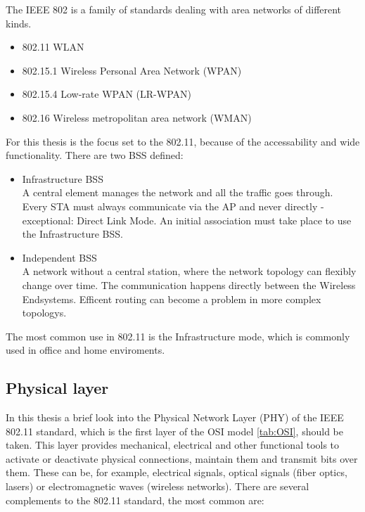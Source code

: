 The \ac{IEEE} 802 is a family of standards dealing with area networks of different kinds.
\begin{itemize}
	\item 802.11 \ac{WLAN}
	\item 802.15.1 Wireless Personal Area Network (WPAN)
	\item 802.15.4 Low-rate WPAN (LR-WPAN)
	\item 802.16 Wireless metropolitan area network (WMAN)
\end{itemize}

For this thesis is the focus set to the 802.11, because of the accessability and wide functionality.
There are two \ac{BSS} defined:
\begin{itemize}
	\label{itm:bss}
	\item Infrastructure BSS\\
	A central element manages the network and all the traffic goes through. 
	Every \ac{STA} must always communicate via the \ac{AP} and never directly - exceptional: Direct Link Mode.
	An initial association must take place to use the Infrastructure \ac{BSS}.
	
	\item Independent BSS\\
	A network without a central station, where the network topology can flexibly change over time.
	The communication happens directly between the Wireless Endsystems.
	Efficent routing can become a problem in more complex topologys.
\end{itemize}
The most common use in 802.11 is the Infrastructure mode, which is commonly used in office and home enviroments.\\ 

\subsection*{Physical layer}

In this thesis a brief look into the Physical Network Layer (PHY) of the IEEE 802.11 standard, 
which is the first layer of the OSI model \ref{tab:OSI}, should be taken.
This layer provides mechanical, electrical and other functional tools to activate or deactivate physical connections, maintain them and transmit bits over them. 
These can be, for example, electrical signals, optical signals (fiber optics, lasers) or electromagnetic waves (wireless networks).
There are several complements to the 802.11 standard, the most common are:

